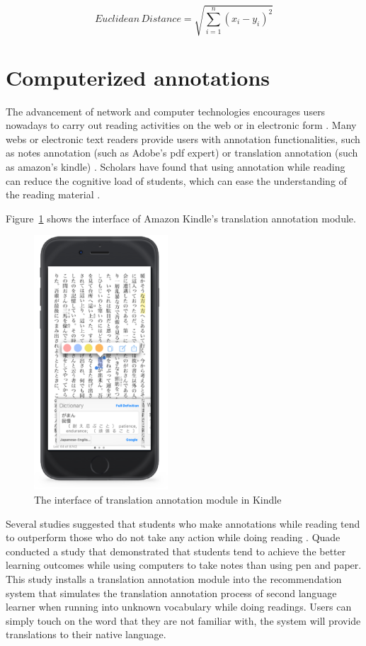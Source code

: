 \begin{equation}\label{eq:euclidean}
  Euclidean \, Distance = \sqrt{\sum_{i=1}^n (x_i-y_i)^2}
\end{equation}

\section{Computerized annotations}

The advancement of network and computer technologies encourages users nowadays to carry out reading activities on the web or in electronic form \cite{Huang2009}. Many webs or electronic text readers provide users with annotation functionalities, such as notes annotation (such as Adobe's pdf expert) \cite{Makany2009} or translation annotation (such as amazon's kindle) \cite{Hsu2013}. Scholars have found that using annotation while reading can reduce the cognitive load of students, which can ease the understanding of the reading material \cite{Dror2008}.

Figure~\ref{figure:kindle} shows the interface of Amazon Kindle's translation annotation module.
\begin{figure}[tbp]
 \begin{center}
  \includegraphics[width=50mm]{kindle_annotation.eps}
 \end{center}
 \caption{\label{figure:kindle} The interface of translation annotation module in Kindle}
\end{figure}

Several studies suggested that students who make annotations while reading tend to outperform those who do not take any action while doing reading \cite{Brown1978}. Quade \cite{Quade1996} conducted a study that demonstrated that students tend to achieve the better learning outcomes while using computers to take notes than using pen and paper. This study installs a translation annotation module into the recommendation system that simulates the translation annotation process of second language learner when running into unknown vocabulary while doing readings. Users can simply touch on the word that they are not familiar with, the system will provide translations to their native language.

